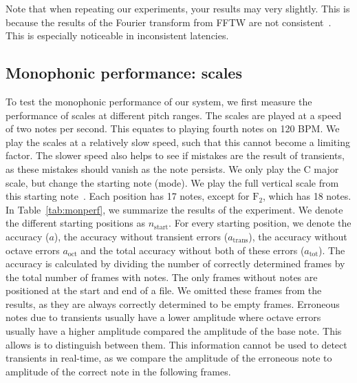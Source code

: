 \documentclass[10pt,twocolumn]{article}
\begin{document}
Note that when repeating our experiments, your results may very slightly. This is because the results of the Fourier transform from FFTW are not consistent~\cite{fftw}. This is especially noticeable in inconsistent latencies.

\subsection{Monophonic performance: scales}
To test the monophonic performance of our system, we first measure the performance of scales at different pitch ranges. The scales are played at a speed of two notes per second. This equates to playing fourth notes on 120 BPM. We play the scales at a relatively slow speed, such that this cannot become a limiting factor. The slower speed also helps to see if mistakes are the result of transients, as these mistakes should vanish as the note persists. We only play the C major scale, but change the starting note (mode). We play the full vertical scale from this starting note~\cite{scale}. Each position has 17 notes, except for $\text{F}_2$, which has 18 notes. In Table~\ref{tab:monperf}, we summarize the results of the experiment. We denote the different starting positions as $n_\text{start}$. For every starting position, we denote the accuracy ($a$), the accuracy without transient errors ($a_\text{trans}$), the accuracy without octave errors $a_\text{oct}$ and the total accuracy without both of these errors ($a_\text{tot}$). The accuracy is calculated by dividing the number of correctly determined frames by the total number of frames with notes. The only frames without notes are positioned at the start and end of a file. We omitted these frames from the results, as they are always correctly determined to be empty frames. Erroneous notes due to transients usually have a lower amplitude where octave errors usually have a higher amplitude compared the amplitude of the base note. This allows is to distinguish between them. This information cannot be used to detect transients in real-time, as we compare the amplitude of the erroneous note to amplitude of the correct note in the following frames.
\end{document}
